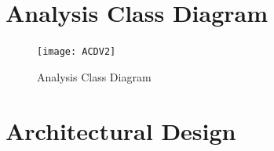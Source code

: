 \documentclass[]{article}
\begin{document}
\section{Analysis Class Diagram}
\label{sec:analysis_class_diagram}
\begin{figure}[H]
	\centering
	\texttt{[image: ACDV2]}
	\caption{Analysis Class Diagram}
	\label{Analysis Class Diagram}
\end{figure}


\section{Architectural Design}
\label{sec:architectural_design}
\end{document}
